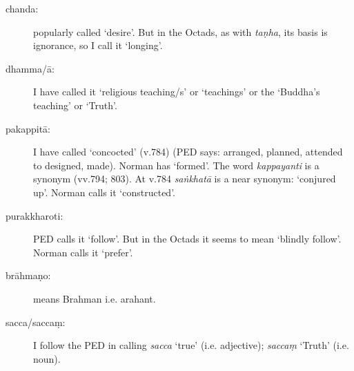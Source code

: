 \begin{description}
\item[chanda:] popularly called `desire'. But in the Octads, as with \textit{taṇha}, its basis is ignorance, so I call it `longing'. 

\item[dhamma/ā:] I have called it `religious teaching/s' or `teachings' or the `Buddha's teaching' or `Truth'.

\item[pakappitā:] I have called `concocted' (v.784) (PED says: arranged, planned, attended to designed, made). Norman has `formed'. The word \textit{kappayanti} is a synonym (vv.794; 803). At v.784 \textit{saṅkhatā} is a near synonym: `conjured up'. Norman calls it `constructed'.

\label{transl-blindly-follow}
\item[purakkharoti:] PED calls it `follow'. But in the Octads it seems to mean `blindly follow'. Norman calls it `prefer'.

\item[brāhmaṇo:] means Brahman i.e. arahant.

\item[sacca/saccaṃ:] I follow the PED in calling \textit{sacca} `true' (i.e. adjective); \textit{saccaṃ} `Truth' (i.e. noun).

\end{description}
